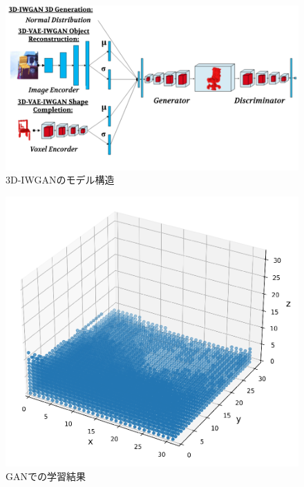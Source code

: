 \documentclass[uplatex,twocolumn, dvipdfmx]{jsarticle}  %
\begin{document}
\begin{figure}[t]
  \begin{center}
   \includegraphics[width=1.0\linewidth]{images/3d_gan_large.png}
   \caption{3D-IWGANのモデル構造}\label{fig:3d_gan}
  \end{center}
\end{figure}

\begin{figure}[t]
  \begin{center}
   \includegraphics[width=0.8\linewidth]{images/voxel.png}
   \caption{GANでの学習結果}\label{fig:voxel}
  \end{center}
\end{figure}
\end{document}
